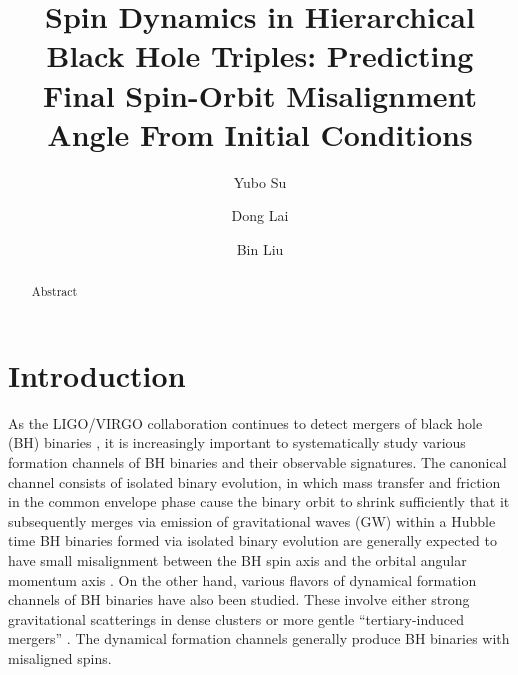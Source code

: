 \documentclass[
        twocolumn,
        twocolappendix
    ]{aastex63}
\begin{document}
\title{Spin Dynamics in Hierarchical Black Hole Triples: Predicting Final
Spin-Orbit Misalignment Angle From Initial Conditions}


\author[0000-0001-8283-3425]{Yubo Su}%

\author[0000-0002-1934-6250]{Dong Lai}%

\author[0000-0002-0643-8295]{Bin Liu}%

\begin{abstract}
    Abstract
\end{abstract}


\section{Introduction}\label{s:intro}

As the LIGO/VIRGO collaboration continues to detect mergers of black hole (BH)
binaries \citep[e.g.][]{Abbott:2016blz, abbott2019binary}, it is increasingly
important to systematically study various formation channels of BH binaries and
their observable signatures. The canonical channel consists of isolated binary
evolution, in which mass transfer and friction in the common envelope phase
cause the binary orbit to shrink sufficiently that it subsequently merges via
emission of gravitational waves (GW) within a Hubble time
\citep[e.g.][]{lipunov1997black, lipunov2017first, podsiadlowski2003formation,
belczynski2010effect, belczynski2016first, dominik2012double, dominik2013double,
dominik2015double} BH binaries formed via isolated binary evolution are
generally expected to have small misalignment between the BH spin axis and the
orbital angular momentum axis \citep{postnov2019black,
belczynski2020evolutionary}. On the other hand, various flavors of dynamical
formation channels of BH binaries have also been studied. These involve either
strong gravitational scatterings in dense clusters
\citep[e.g.][]{zwart1999black, o2006binary, miller2009mergers,
banerjee2010stellar, downing2010compact, ziosi2014dynamics, rodriguez2015binary,
samsing2017assembly, samsing2018black, rodriguez2018post, gondan2018eccentric}
or more gentle ``tertiary-induced mergers'' \citep[e.g.][]{blaes2002kozai,
miller2002four, wen2003eccentricity, antonini2012secular, antonini2017binary,
silsbee2016lidov, bin1, bin2, randall2018induced, hoang2018black}. The dynamical
formation channels generally produce BH binaries with misaligned spins.
\end{document}
